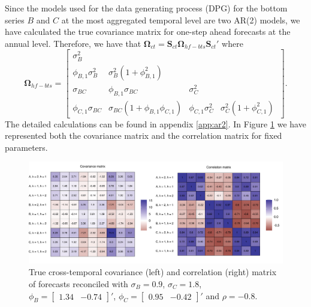 \documentclass[a4paper,11pt]{article}
\newcommand{\Svet}{\bm{S}}
\newcommand{\Omegavet}{\bm{\Omega}}
\theoremstyle{definition}
\begin{document}
Since the models used for the data generating process (DPG) for the bottom series $B$ and $C$ at the most aggregated temporal level are two AR(2) models, we have calculated the true covariance matrix for one-step ahead forecasts at the annual level. Therefore, we have that $\Omegavet_{ct} = \Svet_{ct}\Omegavet_{hf-bts}\Svet_{ct}'$ where
$$
\Omegavet_{hf-bts} = \begin{bmatrix}
\sigma^2_B & & & \\
\phi_{B,1}\sigma_B^2 & \sigma_B^2\left(1+\phi_{B,1}^2\right) & & \\
\sigma_{BC} & \phi_{B,1}\sigma_{BC} & \sigma_C^2& \\
\phi_{C,1}\sigma_{BC} & \sigma_{BC}\left(1+\phi_{B,1}\phi_{C,1} \right)& \phi_{C,1}\sigma_C^2 & \sigma_C^2\left(1+\phi_{C,1}^2\right)\
\end{bmatrix}.
$$
The detailed calculations can be found in appendix \ref{app:ar2}.
In Figure \ref{fig:covcorMC} we have represented both the covariance matrix and the correlation matrix for fixed parameters.

\begin{figure}[!b]
\centering
\includegraphics[width = \linewidth]{fig/simAR/covcor.pdf}
\caption{True cross-temporal covariance (left) and correlation (right) matrix of forecasts reconciled with $\sigma_B = 0.9$, $\sigma_C = 1.8$, $\phi_B =  \begin{bmatrix} 1.34 & -0.74 \end{bmatrix}'$, $\phi_C = \begin{bmatrix} 0.95 & -0.42 \end{bmatrix}'$ and $\rho = -0.8$.}
\label{fig:covcorMC}
\end{figure}
\end{document}

